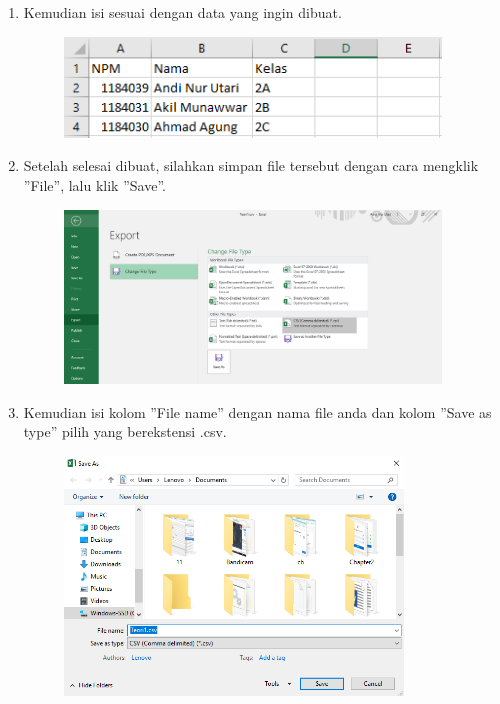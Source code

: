 \begin{enumerate}
\begin{enumerate}
		\item Kemudian isi sesuai dengan data yang ingin dibuat.
		
		\begin{figure}[!htbp]
			\includegraphics[width=10cm]{figures/a2.PNG}
			\centering
		\end{figure}
		
		\item Setelah selesai dibuat, silahkan simpan file tersebut dengan cara mengklik ''File'', lalu klik ''Save''.
		
		\begin{figure}[!htbp]
			\includegraphics[width=10cm]{figures/a3.PNG}
			\centering
		\end{figure}
		\newpage
		
		\item Kemudian isi kolom ''File name'' dengan nama file anda dan kolom ''Save as type'' pilih yang berekstensi .csv.
		
		\begin{figure}[!htbp]
			\includegraphics[width=9cm]{figures/a4.PNG}
			\centering
		\end{figure}
		

\end{enumerate}
\end{enumerate}
